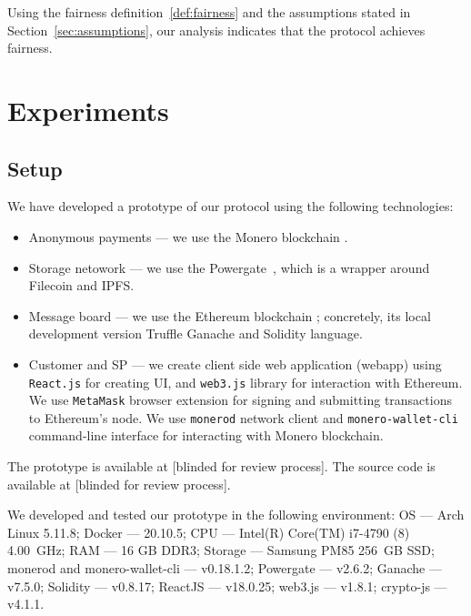 \documentclass[pdftex,twocolumn,epjc3]{svjour3}
\begin{document}
{Using the fairness definition~\ref{def:fairness} and the assumptions stated in Section~\ref{sec:assumptions}, our analysis indicates that the protocol achieves fairness.

\section{Experiments}\label{sec:experiments}

\subsection*{Setup}

We have developed a prototype of our protocol using the following technologies:

\begin{itemize}
  \item{Anonymous payments} — we use the Monero blockchain \cite{noetherRingSignatureConfidential2015}.
  \item{Storage netowork} — we use the Powergate~\cite{textilePowergate2023}, which is a wrapper around Filecoin and IPFS.
  \item{Message board} — we use the Ethereum blockchain \cite{woodEthereumSecureDecentralised2014}; concretely, its local development version Truffle Ganache and Solidity language.
  \item{Customer and SP} — we create client side web application (webapp) using \texttt{React.js} for creating UI, and \texttt{web3.js} library for interaction with Ethereum. We use \texttt{MetaMask} browser extension for signing and submitting transactions to Ethereum's node. We use \texttt{monerod} network client and \texttt{monero-wallet-cli} command-line interface for interacting with Monero blockchain.
\end{itemize}

The prototype is available at [blinded for review process]. The source code is available at [blinded for review process].


We developed and tested our prototype in the following environment: OS — Arch Linux 5.11.8; Docker — 20.10.5; CPU — Intel(R) Core(TM) i7-4790 (8) 4.00~GHz; RAM — 16 GB DDR3; Storage — Samsung PM85 256~GB SSD; monerod and monero-wallet-cli — v0.18.1.2; Powergate — v2.6.2; Ganache — v7.5.0; Solidity — v0.8.17; ReactJS — v18.0.25; web3.js — v1.8.1; crypto-js — v4.1.1.

}
\end{document}
